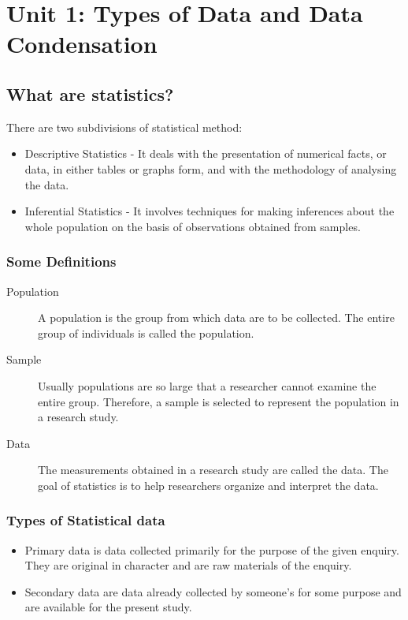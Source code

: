 \documentclass[
10pt, %
a4paper, %
]{report}
\begin{document}


\chapter*{Unit 1: Types of Data and Data Condensation}



\section*{What are statistics?}

There are two subdivisions of statistical method:
\begin{itemize}
\item Descriptive Statistics - It deals with the presentation of
numerical facts, or data, in either tables or graphs form,
and with the methodology of analysing the data.
\item Inferential Statistics - It involves techniques for making
inferences about the whole population on the basis of
observations obtained from samples.
\end{itemize}

\subsection*{Some Definitions}
\begin{description}
\item[Population] A population is the group from which data are to be collected. The entire group of individuals is called the population.
\item[Sample] Usually populations are so large that a researcher cannot examine the entire group. Therefore, a sample is selected to represent the population in a research study.
\item[Data] The measurements obtained in a research study are called the data. The goal of statistics is to help researchers organize and interpret the data.
\end{description}

\subsection*{Types of Statistical data}
\begin{itemize}
\item Primary data is data collected primarily for the purpose of
the given enquiry. They are original in character and are raw
materials of the enquiry.
\item Secondary data are data already collected by someone's for
some purpose and are available for the present study.
\end{itemize}
\end{document}
